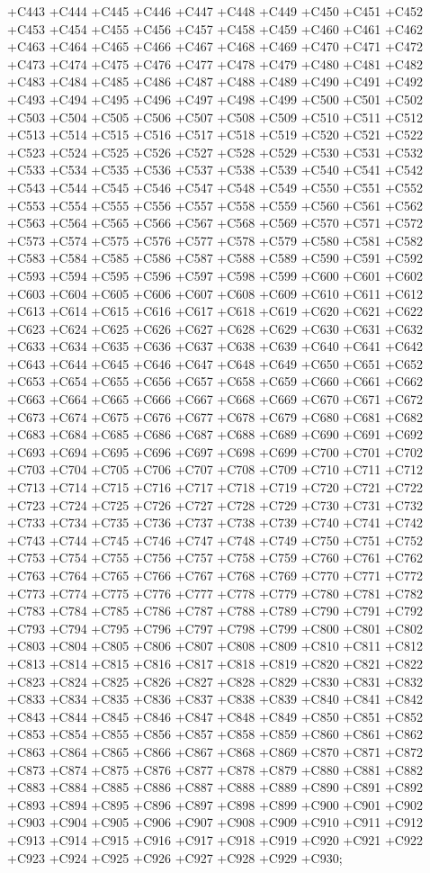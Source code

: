  +C443 +C444 +C445 +C446 +C447 +C448 +C449 +C450 +C451 +C452 +C453 +C454 +C455 +C456 +C457 +C458 +C459
 +C460 +C461 +C462 +C463 +C464 +C465 +C466 +C467 +C468 +C469 +C470 +C471 +C472 +C473 +C474 +C475 +C476
 +C477 +C478 +C479 +C480 +C481 +C482 +C483 +C484 +C485 +C486 +C487 +C488 +C489 +C490 +C491 +C492 +C493
 +C494 +C495 +C496 +C497 +C498 +C499 +C500 +C501 +C502 +C503 +C504 +C505 +C506 +C507 +C508 +C509 +C510
 +C511 +C512 +C513 +C514 +C515 +C516 +C517 +C518 +C519 +C520 +C521 +C522 +C523 +C524 +C525 +C526 +C527
 +C528 +C529 +C530 +C531 +C532 +C533 +C534 +C535 +C536 +C537 +C538 +C539 +C540 +C541 +C542 +C543 +C544
 +C545 +C546 +C547 +C548 +C549 +C550 +C551 +C552 +C553 +C554 +C555 +C556 +C557 +C558 +C559 +C560 +C561
 +C562 +C563 +C564 +C565 +C566 +C567 +C568 +C569 +C570 +C571 +C572 +C573 +C574 +C575 +C576 +C577 +C578
 +C579 +C580 +C581 +C582 +C583 +C584 +C585 +C586 +C587 +C588 +C589 +C590 +C591 +C592 +C593 +C594 +C595
 +C596 +C597 +C598 +C599 +C600 +C601 +C602 +C603 +C604 +C605 +C606 +C607 +C608 +C609 +C610 +C611 +C612
 +C613 +C614 +C615 +C616 +C617 +C618 +C619 +C620 +C621 +C622 +C623 +C624 +C625 +C626 +C627 +C628 +C629
 +C630 +C631 +C632 +C633 +C634 +C635 +C636 +C637 +C638 +C639 +C640 +C641 +C642 +C643 +C644 +C645 +C646
 +C647 +C648 +C649 +C650 +C651 +C652 +C653 +C654 +C655 +C656 +C657 +C658 +C659 +C660 +C661 +C662 +C663
 +C664 +C665 +C666 +C667 +C668 +C669 +C670 +C671 +C672 +C673 +C674 +C675 +C676 +C677 +C678 +C679 +C680
 +C681 +C682 +C683 +C684 +C685 +C686 +C687 +C688 +C689 +C690 +C691 +C692 +C693 +C694 +C695 +C696 +C697
 +C698 +C699 +C700 +C701 +C702 +C703 +C704 +C705 +C706 +C707 +C708 +C709 +C710 +C711 +C712 +C713 +C714
 +C715 +C716 +C717 +C718 +C719 +C720 +C721 +C722 +C723 +C724 +C725 +C726 +C727 +C728 +C729 +C730 +C731
 +C732 +C733 +C734 +C735 +C736 +C737 +C738 +C739 +C740 +C741 +C742 +C743 +C744 +C745 +C746 +C747 +C748
 +C749 +C750 +C751 +C752 +C753 +C754 +C755 +C756 +C757 +C758 +C759 +C760 +C761 +C762 +C763 +C764 +C765
 +C766 +C767 +C768 +C769 +C770 +C771 +C772 +C773 +C774 +C775 +C776 +C777 +C778 +C779 +C780 +C781 +C782
 +C783 +C784 +C785 +C786 +C787 +C788 +C789 +C790 +C791 +C792 +C793 +C794 +C795 +C796 +C797 +C798 +C799
 +C800 +C801 +C802 +C803 +C804 +C805 +C806 +C807 +C808 +C809 +C810 +C811 +C812 +C813 +C814 +C815 +C816
 +C817 +C818 +C819 +C820 +C821 +C822 +C823 +C824 +C825 +C826 +C827 +C828 +C829 +C830 +C831 +C832 +C833
 +C834 +C835 +C836 +C837 +C838 +C839 +C840 +C841 +C842 +C843 +C844 +C845 +C846 +C847 +C848 +C849 +C850
 +C851 +C852 +C853 +C854 +C855 +C856 +C857 +C858 +C859 +C860 +C861 +C862 +C863 +C864 +C865 +C866 +C867
 +C868 +C869 +C870 +C871 +C872 +C873 +C874 +C875 +C876 +C877 +C878 +C879 +C880 +C881 +C882 +C883 +C884
 +C885 +C886 +C887 +C888 +C889 +C890 +C891 +C892 +C893 +C894 +C895 +C896 +C897 +C898 +C899 +C900 +C901
 +C902 +C903 +C904 +C905 +C906 +C907 +C908 +C909 +C910 +C911 +C912 +C913 +C914 +C915 +C916 +C917 +C918
 +C919 +C920 +C921 +C922 +C923 +C924 +C925 +C926 +C927 +C928 +C929 +C930; \\

